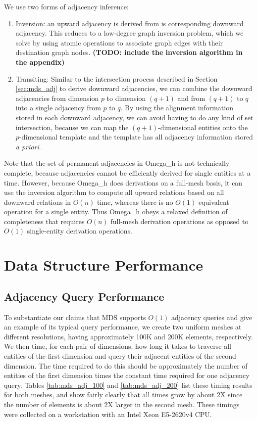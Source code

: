 We use two forms of adjacency inference:
\begin{enumerate}
\item Inversion: an upward adjacency is derived from is corresponding downward
adjacency. This reduces to a low-degree graph inversion problem, which we
solve by using atomic operations to associate graph edges with their
destination graph nodes.
{\bf (TODO: include the inversion algorithm in the appendix)}
\item Transiting: Similar to the intersection process described in Section
\ref{sec:mds_adj} to derive downward adjacencies, we can combine the
downward adjacencies from dimension $p$ to dimension $(q+1)$ and
from $(q+1)$ to $q$ into a single adjacency from $p$ to $q$.
By using the alignment information stored in each downward adjacency,
we can avoid having to do any kind of set intersection, because we
can map the $(q+1)$-dimensional entities onto the $p$-dimensional template
and the template has all adjacency information stored {\it a priori}.
\end{enumerate}

Note that the set of permanent adjacencies in Omega\_h is not technically
complete, because adjacencies cannot be efficiently derived for
single entities at a time.
However, because Omega\_h does derivations on a full-mesh basis,
it can use the inversion algorithm to compute
all upward relations based on all downward relations in $O(n)$
time, whereas there is no $O(1)$ equivalent operation for a
single entity.
Thus Omega\_h obeys a relaxed definition of completeness that
requires $O(n)$ full-mesh derivation operations as opposed
to $O(1)$ single-entity derivation operations.

\section{Data Structure Performance}

\subsection{Adjacency Query Performance}
\label{sec:adj_perf}

To substantiate our claims that MDS supports $O(1)$ adjacency queries and
give an example of its typical query performance, we create two
uniform meshes at different resolutions, having approximately
100K and 200K elements, respectively.
We then time, for each pair of dimensions, how long it takes
to traverse all entities of the first dimension and query their
adjacent entities of the second dimension.
The time required to do this should be approximately the number
of entities of the first dimension times the constant time
required for one adjacency query.
Tables \ref{tab:mds_adj_100} and \ref{tab:mds_adj_200} list these timing
results for both meshes, and show fairly clearly that all times
grow by about 2X since the number of elements is about 2X larger
in the second mesh.
These timings were collected on a workstation with an Intel Xeon E5-2620v4 CPU.

